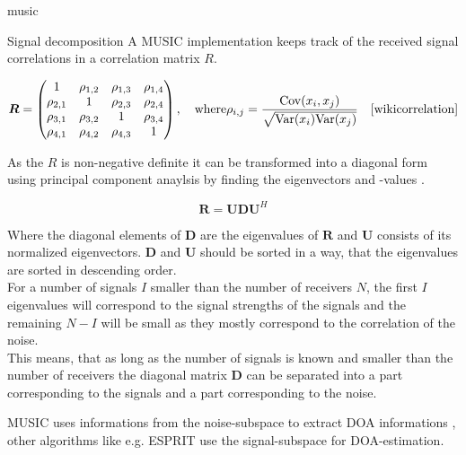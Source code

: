 \begin{subchapter}{\acrshort{music}}
\begin{subsubchapter}{Signal decomposition}
    A MUSIC implementation keeps track of the received signal
    correlations in a correlation matrix $R$.

    \begin{equation}
      \bm{R} =
        \begin{pmatrix}
          1          & \rho_{1,2} & \rho_{1,3} & \rho_{1,4} \\
          \rho_{2,1} &          1 & \rho_{2,3} & \rho_{2,4} \\
          \rho_{3,1} & \rho_{3,2} &          1 & \rho_{3,4} \\
          \rho_{4,1} & \rho_{4,2} & \rho_{4,3} &          1 \\
        \end{pmatrix} , \quad \text{where}
        \rho_{i,j} = \frac{\mathrm{Cov}(x_{i}, x_{j})}{\sqrt{\mathrm{Var}(x_{i})\mathrm{Var}(x_{j})}}
      \quad \text{\cite{wikicorrelation}}
    \end{equation}

    As the $R$ is non-negative definite \cite[p. 9]{girdmusic}
    it can be transformed into a diagonal form using
    principal component anaylsis by finding the eigenvectors and -values
    \cite[p. 325]{bronstein2016}.

    \begin{equation}
      \bm{R} = \bm{U} \bm{D} \bm{U}^{H}
    \end{equation}

    Where the diagonal elements of $\bm{D}$
    are the eigenvalues of $\bm{R}$ and $\bm{U}$
    consists of its normalized eigenvectors.
    $\bm{D}$ and $\bm{U}$ should be sorted in a way,
    that the eigenvalues are sorted in descending order. \\

    For a number of signals $I$ smaller than the
    number of receivers $N$, the first $I$ eigenvalues
    will correspond to the signal strengths of the signals
    and the remaining $N - I$ will be small as they
    mostly correspond to the correlation of the noise. \\

    This means, that as long as the number of signals is
    known and smaller than the number of receivers the
    diagonal matrix $\bm{D}$ can be separated into a part
    corresponding to the signals and a part corresponding to
    the noise.

    MUSIC uses informations from the noise-subspace to extract
    DOA informations \cite{madisetti2010}, other algorithms
    like e.g. ESPRIT use the signal-subspace for DOA-estimation.


  \end{subsubchapter}
\end{subchapter}
